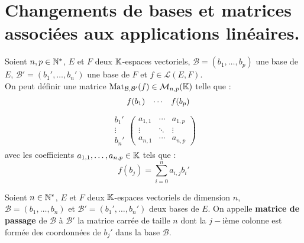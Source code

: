 \section{Changements de bases et matrices associées aux applications linéaires.}

\begin{definition}
    Soient $n, p \in \mathbb{N}^*$, $E$ et $F$ deux $\mathbb{K}$-espaces vectoriels, $\mathcal{B} = (b_1, \ldots, b_p)$ une base de $E$, $\mathcal{B}' = (b_1', \ldots, b_n')$ une base de $F$ et $f \in \mathcal{L}(E, F)$.
    \\
    On peut définir une matrice $\operatorname{Mat}_{\mathcal{B},\mathcal{B}'} (f) \in \mathcal{M}_{n,p}(\mathbb{K})$ telle que :
    \begin{align*}
        \hspace{0.4cm}
        \begin{matrix}
            f(b_1) & \cdots & f(b_p) 
        \end{matrix}
    \end{align*}
    \vspace{-0.8cm}
    \begin{align*}
        \begin{matrix}
            b_1' \\
            \vdots \\ 
            b_n'
        \end{matrix}
        \begin{pmatrix}
            a_{1,1} & \cdots & a_{1,p} \\
            \vdots & \ddots & \vdots \\ 
            a_{n,1} & \cdots & a_{n,p}
        \end{pmatrix}
    \end{align*}
    avec les coefficients $a_{1,1}, \ldots, a_{n,p} \in \mathbb{K}$ tels que : 
    \[ f(b_j) = \sum_{i = 0}^n a_{i,j} b_i' \]
\end{definition}

\begin{definition}
    Soient $n \in \mathbb{N}^*$, $E$ et $F$ deux $\mathbb{K}$-espaces vectoriels de dimension $n$, $\mathcal{B} = (b_1, \ldots, b_n)$ et $\mathcal{B}' = (b_1', \ldots, b_n')$ deux bases de $E$. On appelle \textbf{matrice de passage} de $\mathcal{B}$ à $\mathcal{B}'$ la matrice carrée de taille $n$ dont la $j-$ième colonne est formée des coordonnées de $b_j'$ dans la base $\mathcal{B}$.
\end{definition}

